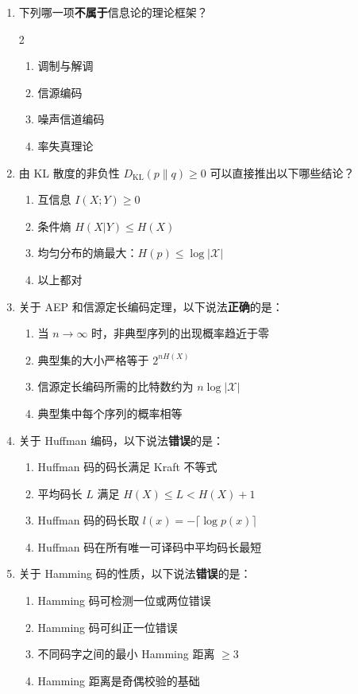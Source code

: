 \documentclass[12pt,a4paper]{ctexart}
\newcommand{\XX}{\mathcal{X}}
\newcommand{\DKL}{D_{\mathrm{KL}}}
\begin{document}
\begin{enumerate}[label=\arabic*., leftmargin=*]

\item 下列哪一项\textbf{不属于}信息论的理论框架？
\begin{multicols}{2}
\begin{enumerate}[label=(\Alph*)]
  \item 调制与解调
  \item 信源编码
  \item 噪声信道编码
  \item 率失真理论
\end{enumerate}
\end{multicols}

\item 由 KL 散度的非负性 $\DKL(p\|q) \geq 0$ 可以直接推出以下哪些结论？
\begin{enumerate}[label=(\Alph*)]
  \item 互信息 $I(X;Y) \geq 0$
  \item 条件熵 $H(X|Y) \leq H(X)$
  \item 均匀分布的熵最大：$H(p) \leq \log|\XX|$
  \item 以上都对
\end{enumerate}

\item 关于 AEP 和信源定长编码定理，以下说法\textbf{正确}的是：
\begin{enumerate}[label=(\Alph*)]
  \item 当 $n\to\infty$ 时，非典型序列的出现概率趋近于零
  \item 典型集的大小严格等于 $2^{nH(X)}$
  \item 信源定长编码所需的比特数约为 $n\log|\XX|$
  \item 典型集中每个序列的概率相等
\end{enumerate}

\item 关于 Huffman 编码，以下说法\textbf{错误}的是：
\begin{enumerate}[label=(\Alph*)]
  \item Huffman 码的码长满足 Kraft 不等式
  \item 平均码长 $L$ 满足 $H(X) \leq L < H(X)+1$
  \item Huffman 码的码长取 $l(x) = -\lceil\log p(x)\rceil$
  \item Huffman 码在所有唯一可译码中平均码长最短
\end{enumerate}

\item 关于 Hamming 码的性质，以下说法\textbf{错误}的是：
\begin{enumerate}[label=(\Alph*)]
  \item Hamming 码可检测一位或两位错误
  \item Hamming 码可纠正一位错误
  \item 不同码字之间的最小 Hamming 距离 $\geq 3$
  \item Hamming 距离是奇偶校验的基础
\end{enumerate}


\end{enumerate}
\end{document}
